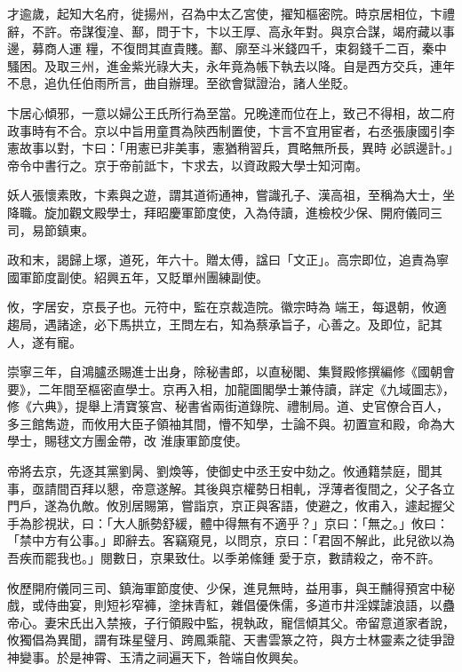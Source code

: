 \begin{pinyinscope}
 才逾歲，起知大名府，徙揚州，召為中太乙宮使，擢知樞密院。時京居相位，卞禮辭，不許。帝謀復湟、鄯，問于卞，卞以王厚、高永年對。與京合謀，竭府藏以事邊，募商人運
 糧，不復問其直貴賤。鄯、廓至斗米錢四千，束芻錢千二百，秦中騷困。及取三州，進金紫光祿大夫，永年竟為帳下執去以降。自是西方交兵，連年不息，追仇任伯雨所言，曲自辦理。至欲會獄證治，諸人坐貶。



 卞居心傾邪，一意以婦公王氏所行為至當。兄晚達而位在上，致己不得相，故二府政事時有不合。京以中旨用童貫為陝西制置使，卞言不宜用宦者，右丞張康國引李憲故事以對，卞曰：「用憲已非美事，憲猶稍習兵，貫略無所長，異時
 必誤邊計。」帝令中書行之。京于帝前詆卞，卞求去，以資政殿大學士知河南。



 妖人張懷素敗，卞素與之遊，謂其道術通神，嘗識孔子、漢高祖，至稱為大士，坐降職。旋加觀文殿學士，拜昭慶軍節度使，入為侍讀，進檢校少保、開府儀同三司，易節鎮東。



 政和末，謁歸上塚，道死，年六十。贈太傅，諡曰「文正」。高宗即位，追責為寧國軍節度副使。紹興五年，又貶單州團練副使。



 攸，字居安，京長子也。元符中，監在京裁造院。徽宗時為
 端王，每退朝，攸適趨局，遇諸途，必下馬拱立，王問左右，知為蔡承旨子，心善之。及即位，記其人，遂有寵。



 崇寧三年，自鴻臚丞賜進士出身，除秘書郎，以直秘閣、集賢殿修撰編修《國朝會要》，二年間至樞密直學士。京再入相，加龍圖閣學士兼侍讀，詳定《九域圖志》，修《六典》，提舉上清寶箓宫、秘書省兩街道錄院、禮制局。道、史官僚合百人，多三館雋遊，而攸用大臣子領袖其間，懵不知學，士論不與。初置宣和殿，命為大學士，賜毬文方團金帶，改
 淮康軍節度使。



 帝將去京，先逐其黨劉昺、劉煥等，使御史中丞王安中劾之。攸通籍禁庭，聞其事，亟請間百拜以懇，帝意遂解。其後與京權勢日相軋，浮薄者復間之，父子各立門戶，遂為仇敵。攸別居賜第，嘗詣京，京正與客語，使避之，攸甫入，遽起握父手為胗視狀，曰：「大人脈勢舒緩，體中得無有不適乎？」京曰：「無之。」攸曰：「禁中方有公事。」即辭去。客竊窺見，以問京，京曰：「君固不解此，此兒欲以為吾疾而罷我也。」閱數日，京果致仕。以季弟絛鍾
 愛于京，數請殺之，帝不許。



 攸歷開府儀同三司、鎮海軍節度使、少保，進見無時，益用事，與王黼得預宮中秘戲，或侍曲宴，則短衫窄褲，塗抹青紅，雜倡優侏儒，多道市井淫媟謔浪語，以蠱帝心。妻宋氏出入禁掖，子行領殿中監，視執政，寵信傾其父。帝留意道家者說，攸獨倡為異聞，謂有珠星璧月、跨鳳乘龍、天書雲篆之符，與方士林靈素之徒爭證神變事。於是神霄、玉清之祠遍天下，咎端自攸興矣。




\end{pinyinscope}
